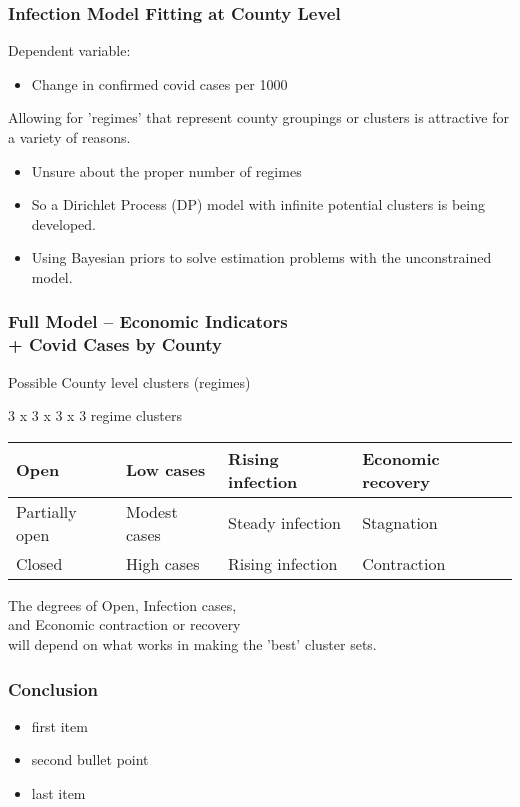 \documentclass{beamer}
\begin{document}
\begin{frame}
	\frametitle{Infection Model Fitting at County Level}

Dependent variable:\\
\begin{itemize}
	\item Change in confirmed covid cases per 1000 
\end{itemize}

\medskip

Allowing for 'regimes' that represent county groupings  or clusters is attractive for a variety of reasons.
\\
\begin{itemize}
	\item Unsure about the proper number of regimes
	\item So a Dirichlet Process (DP) model with infinite potential clusters is being developed.
	\item Using Bayesian priors to solve estimation problems with the unconstrained model. 
\end{itemize}
   	
\end{frame}


\begin{frame}
	\frametitle{Full Model -- Economic Indicators\\
		 + Covid Cases by County }
	
	
{\large
	Possible County level clusters (regimes)\\
}	
	
\medskip

	3 x 3 x 3 x 3 regime clusters\\
	
	\begin{tabular}{|l|l|l|l|}
		\hline
		Open
		& Low cases
		& Rising infection 
		& Economic recovery
		 \\
		\hline
		Partially open 
		& Modest cases
		& Steady infection 
		& Stagnation 
		\\
		\hline
		Closed 
		& High cases
		& Rising infection 
		& Contraction
\\
\hline
	\end{tabular}
	
	\medskip
	\medskip
	
	The degrees of Open, Infection cases, \\  and Economic contraction or recovery \\
	will depend on what works in making the 'best' cluster sets.  
	
\end{frame}

	
\begin{frame}
		\frametitle{Conclusion}
		
		\begin{itemize}
			\item first item 
			\item second bullet point
			\item last item
		\end{itemize}
\end{frame}
\end{document}
